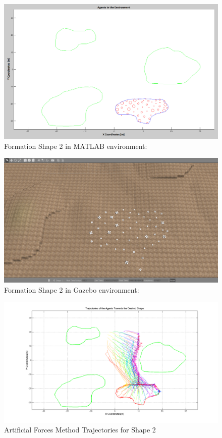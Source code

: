 		   \begin{figure}[H]
		   	\caption{Formation Shape 2 in MATLAB environment:}
		   	\centerline{\includegraphics[scale = 0.40]{Trajectories_Formation_Shape_2_2}}
		   \end{figure} 	
		   
		   \begin{figure}[H]
		   	\caption{Formation Shape 2 in Gazebo environment:}
		   	\centerline{\includegraphics[scale = 0.35]{Trajectories_Formation_Shape_2_1}}
		   \end{figure} 	
		   
		   \begin{figure}[H]
		   	\caption{Artificial Forces Method Trajectories for Shape 2}
		   	\centerline{\includegraphics[scale = 0.35]{Artificial_Trajectories_2}}
		   \end{figure} 	
		   
